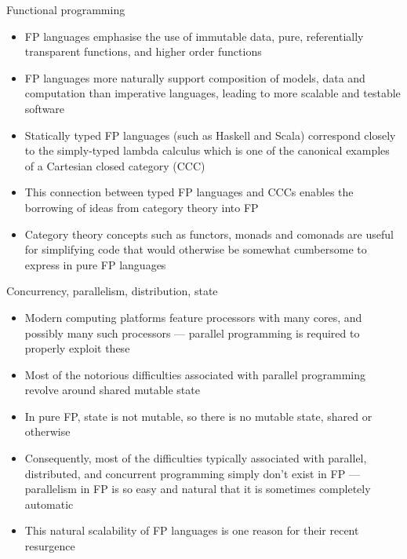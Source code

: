 \documentclass[mathserif,handout]{beamer}
\begin{document}

\begin{frame}{Functional programming}
\protect\hypertarget{functional-programming}{}

\begin{itemize}

\item
  FP languages emphasise the use of \alert{immutable} data, \alert{pure,
  referentially transparent functions}, and \alert{higher order
  functions}
\item
  FP languages more naturally support composition of models, data and
  computation than imperative languages, leading to more scalable and
  testable software
\item
  Statically typed FP languages (such as Haskell and Scala) correspond
  closely to the \alert{simply-typed lambda calculus} which is one of the
  canonical examples of a \alert{Cartesian closed category} (CCC)
\item
  This connection between typed FP languages and CCCs enables the
  borrowing of ideas from category theory into FP
\item
  Category theory concepts such as \alert{functors}, \alert{monads} and
  \alert{comonads} are useful for simplifying code that would otherwise
  be somewhat cumbersome to express in pure FP languages
\end{itemize}

\end{frame}

\begin{frame}{Concurrency, parallelism, distribution, state}
\protect\hypertarget{concurrency-parallelism-distribution-state}{}

\begin{itemize}

\item
  Modern computing platforms feature processors with many cores, and
  possibly many such processors --- parallel programming is required to
  properly exploit these
\item
  Most of the notorious difficulties associated with parallel
  programming revolve around \alert{shared mutable state}
\item
  In pure FP, state is not mutable, so there is no mutable state, shared
  or otherwise
\item
  Consequently, most of the difficulties typically associated with
  parallel, distributed, and concurrent programming simply don't exist in FP ---
  parallelism in FP is so easy and natural that it is sometimes
  completely automatic
\item
  This natural scalability of FP languages is one reason for their
  recent resurgence
\end{itemize}

\end{frame}
\end{document}
